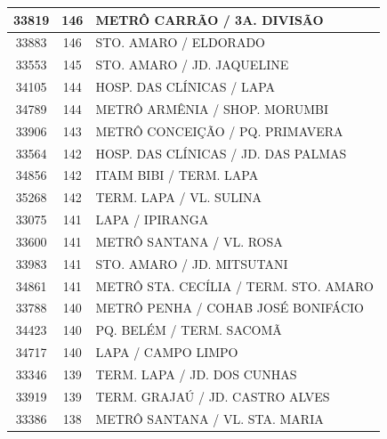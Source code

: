 \documentclass[
	12pt,				%
	oneside,			%
	a4paper,			%
	english,			%
	brazil				%
	]{abntex2ppgsi}
\begin{document}
{{\begin{apendicesenv}
\begin{longtable}{c|c|p{7cm}}
    33819 & 146   & METRÔ CARRÃO / 3A. DIVISÃO \\
\hline

    33883 & 146   & STO. AMARO / ELDORADO \\
\hline

    33553 & 145   & STO. AMARO / JD. JAQUELINE \\
\hline

    34105 & 144   & HOSP. DAS CLÍNICAS / LAPA \\
\hline

    34789 & 144   & METRÔ ARMÊNIA / SHOP. MORUMBI \\
\hline

    33906 & 143   & METRÔ CONCEIÇÃO / PQ. PRIMAVERA \\
\hline

    33564 & 142   & HOSP. DAS CLÍNICAS / JD. DAS PALMAS \\
\hline

    34856 & 142   & ITAIM BIBI / TERM. LAPA \\
\hline

    35268 & 142   & TERM. LAPA / VL. SULINA \\
\hline

    33075 & 141   & LAPA / IPIRANGA \\
\hline

    33600 & 141   & METRÔ SANTANA / VL. ROSA \\
\hline

    33983 & 141   & STO. AMARO / JD. MITSUTANI \\
\hline

    34861 & 141   & METRÔ STA. CECÍLIA / TERM. STO. AMARO \\
\hline

    33788 & 140   & METRÔ PENHA / COHAB JOSÉ BONIFÁCIO \\
\hline

    34423 & 140   & PQ. BELÉM / TERM. SACOMÃ \\
\hline

    34717 & 140   & LAPA / CAMPO LIMPO \\
\hline

    33346 & 139   & TERM. LAPA / JD. DOS CUNHAS \\
\hline

    33919 & 139   & TERM. GRAJAÚ / JD. CASTRO ALVES \\
\hline

    33386 & 138   & METRÔ SANTANA / VL. STA. MARIA \\
\hline


\end{longtable}
\end{apendicesenv}}}
\end{document}
